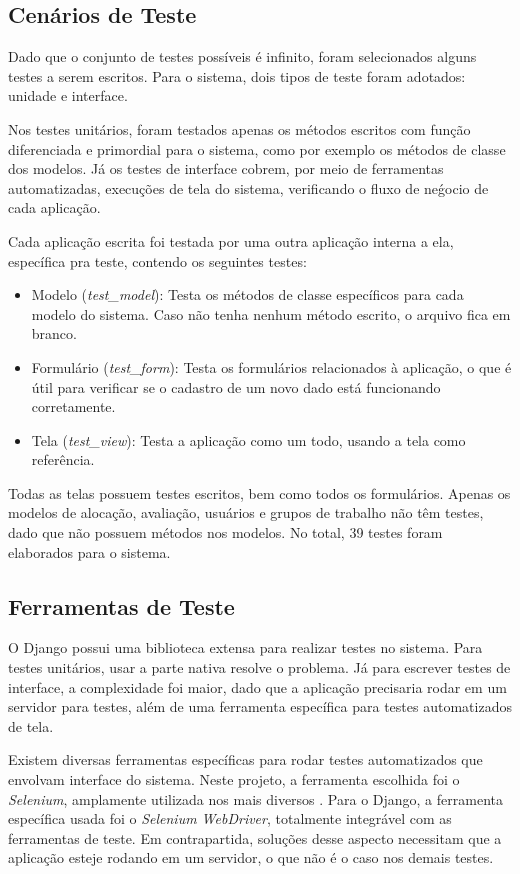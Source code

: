 \subsection{Cenários de Teste}
Dado que o conjunto de testes possíveis é infinito, foram selecionados alguns testes a serem escritos. Para o sistema, dois tipos de teste foram adotados: unidade e interface. 

Nos testes unitários, foram testados apenas os métodos escritos com função diferenciada e primordial para o sistema, como por exemplo os métodos de classe dos modelos. Já os testes de interface cobrem, por meio de ferramentas automatizadas, execuções de tela do sistema, verificando o fluxo de neǵocio de cada aplicação.

Cada aplicação escrita foi testada por uma outra aplicação interna a ela, específica pra teste, contendo os seguintes testes:

\begin{itemize}
    \item Modelo (\textit{test\_model}): Testa os métodos de classe específicos para cada modelo do sistema. Caso não tenha nenhum método escrito, o arquivo fica em branco.
    \item Formulário (\textit{test\_form}): Testa os formulários relacionados à aplicação, o que é útil para verificar se o cadastro de um novo dado está funcionando corretamente.
    \item Tela (\textit{test\_view}): Testa a aplicação como um todo, usando a tela como referência.
\end{itemize}

Todas as telas possuem testes escritos, bem como todos os formulários. Apenas os modelos de alocação, avaliação, usuários e grupos de trabalho não têm testes, dado que não possuem métodos nos modelos. No total, 39 testes foram elaborados para o sistema.

\subsection{Ferramentas de Teste}
O Django possui uma biblioteca extensa para realizar testes no sistema. Para testes unitários, usar a parte nativa resolve o problema. Já para escrever testes de interface, a complexidade foi maior, dado que a aplicação precisaria rodar em um servidor para testes, além de uma ferramenta específica para testes automatizados de tela.

Existem diversas ferramentas específicas para rodar testes automatizados que envolvam interface do sistema. Neste projeto, a ferramenta escolhida foi o \textit{Selenium}\cite{selenium2018}, amplamente utilizada nos mais diversos . Para o Django, a ferramenta específica usada foi o \textit{Selenium WebDriver}, totalmente integrável com as ferramentas de teste. Em contrapartida, soluções desse aspecto necessitam que a aplicação esteje rodando em um servidor, o que não é o caso nos demais testes.

